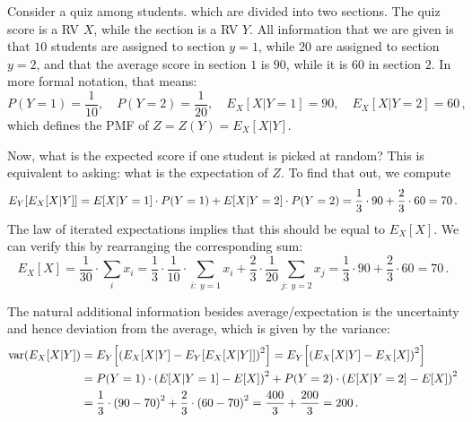 \begin{ex}
Consider a quiz among students. which are divided into two sections. The quiz score is a RV $X$, while the section is a RV $Y$. All information that we are given is that $10$ students are assigned to section $y = 1$, while $20$ are assigned to section $y = 2$, and that the average score in section $1$ is $90$, while it is $60$ in section $2$. In more formal notation, that means:
\begin{equation*}
P(Y = 1) = \frac{1}{10}, \quad P(Y = 2) = \frac{1}{20}, \quad E_X[X | Y = 1] = 90, \quad E_X[X | Y = 2] = 60 \, ,
\end{equation*}
which defines the PMF of $Z = Z(Y) = E_X[X | Y]$.


Now, what is the expected score if one student is picked at random? This is equivalent to asking: what is the expectation of $Z$. To find that out, we compute
\begin{equation*}
E_Y\qty[E_X[X | Y]] = E[X | Y = 1] \cdot P(Y = 1) + E[X | Y = 2] \cdot P(Y = 2) = \frac{1}{3} \cdot 90 + \frac{2}{3} \cdot 60 = 70 \, .
\end{equation*}
The law of iterated expectations implies that this should be equal to $E_X[X]$. We can verify this by rearranging the corresponding sum:
\begin{equation*}
E_X[X] = \frac{1}{30} \cdot \sum_i x_i = \frac{1}{3} \cdot \frac{1}{10} \cdot \sum_{i: \; y = 1} x_i + \frac{2}{3} \cdot \frac{1}{20} \sum_{j: \; y = 2} x_j = \frac{1}{3} \cdot 90 + \frac{2}{3} \cdot 60 = 70 \, .
\end{equation*}

The natural additional information besides average/expectation is the uncertainty and hence deviation from the average, which is given by the variance:
\begin{align*}
\operatorname{var}(E_X[X | Y]) &= E_Y\qty[\qty(E_X[X | Y] - E_Y[E_X[X | Y]])^2] = E_Y\qty[\qty(E_X[X | Y] - E_X[X])^2]
\\
&= P(Y = 1) \cdot \qty(E[X | Y = 1] - E[X])^2 + P(Y = 2) \cdot \qty(E[X | Y = 2] - E[X])^2
\\
&= \frac{1}{3} \cdot \qty(90 - 70)^2 + \frac{2}{3} \cdot \qty(60 - 70)^2 = \frac{400}{3} + \frac{200}{3} = 200 \, .
\end{align*}


\end{ex}
